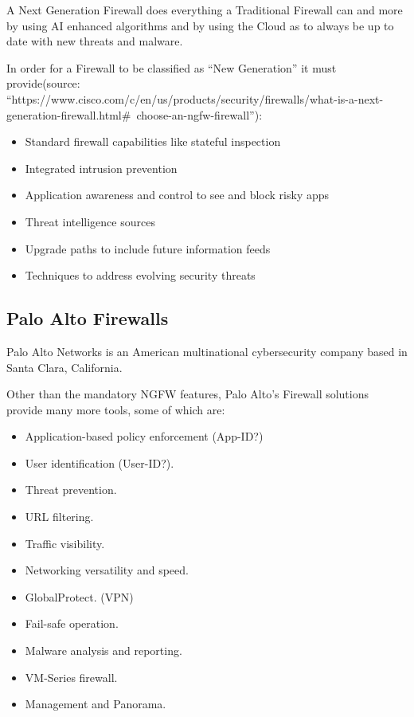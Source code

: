 \newpage

A Next Generation Firewall does everything a Traditional Firewall can and more by using AI enhanced algorithms  and by using the Cloud as to always be up to date with new threats and malware.

In order for a Firewall to be classified as ``New Generation'' it must provide(source: ``https://www.cisco.com/c/en/us/products/security/firewalls/what-is-a-next-generation-firewall.html\#~choose-an-ngfw-firewall''):

\begin{itemize}
 \item Standard firewall capabilities like stateful inspection
 \item Integrated intrusion prevention
 \item Application awareness and control to see and block risky apps
 \item Threat intelligence sources
 \item Upgrade paths to include future information feeds
 \item Techniques to address evolving security threats
\end{itemize}

\newpage

\subsection{Palo Alto Firewalls}

Palo Alto Networks is an American multinational cybersecurity company based in Santa Clara, California.

Other than the mandatory NGFW features, Palo Alto's Firewall solutions provide many more tools, some of which are\cite{panos-features}:

\begin{itemize}
    \item Application-based policy enforcement (App-ID?)
    \item User identification (User-ID?).
    \item Threat prevention.
    \item URL filtering.
    \item Traffic visibility.
    \item Networking versatility and speed.
    \item GlobalProtect. (VPN)
    \item Fail-safe operation.
    \item Malware analysis and reporting.
    \item VM-Series firewall.
    \item Management and Panorama.
\end{itemize}

